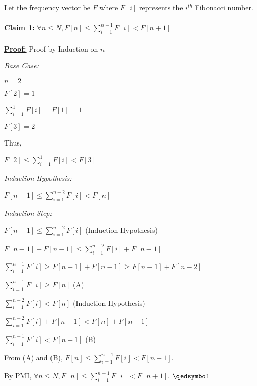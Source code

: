 \documentclass[a4paper]{article}
\begin{document}
\begin{enumerate}[(a)]
\begin{enumerate}[(1)]
    \end{enumerate}
    Let the frequency vector be $F$ where $F[i]$ represents the $i^{th}$ Fibonacci number.\hfill \\ \\
    \underline{\textbf{Claim 1:}} $ \forall n \leq N, F[n] \leq \sum_{i=1}^{n-1} F[i] < F[n+1]$ \\ \\
    \underline{\textbf{Proof:}} Proof by Induction on $n$ \\
    {\textit{Base Case:} \par}
    {\hspace{10mm}    $n = 2$ \par} 
    {\hspace{10mm}    $F[2] = 1$ \par} 
    {\hspace{10mm}    $\sum_{i=1}^{1} F[i] = F[1] = 1$ \par}
    {\hspace{10mm}    $F[3] = 2$ \par}
    {\hspace{10mm} Thus, \par}
    {\hspace{10mm}    $F[2] \leq \sum_{i=1}^{1} F[i] < F[3]$ \par}
    {\textit{Induction Hypothesis:} 
    \par}
    {\hspace{10mm} $F[n-1] \leq \sum_{i=1}^{n-2} F[i] < F[n]$ \par}
    {\textit{Induction Step:} \par}
    {\hspace{10mm} $F[n-1] \leq \sum_{i=1}^{n-2} F[i]$   \hfill (Induction Hypothesis)\par} 
    {\hspace{10mm}    $F[n-1] + F[n-1] \leq \sum_{i=1}^{n-2} F[i] + F[n-1]$ \par}
    {\hspace{10mm}    $\sum_{i=1}^{n-1} F[i] \geq F[n-1] + F[n-1] \geq F[n-1] + F[n-2]$ \par}
    {\hspace{10mm}    $\sum_{i=1}^{n-1} F[i] \geq F[n]$  \hfill (A) \par}
    {\par}
    {\hspace{10mm} $\sum_{i=1}^{n-2} F[i] < F[n]$   \hfill (Induction Hypothesis)\par} 
    {\hspace{10mm}    $\sum_{i=1}^{n-2} F[i] + F[n-1] < F[n] + F[n-1]$ \par}
    {\hspace{10mm}    $\sum_{i=1}^{n-1} F[i] < F[n+1]$ \hfill (B)\par}
    {\hspace{10mm} From (A) and (B), $F[n] \leq \sum_{i=1}^{n-1} F[i] < F[n+1]$.\par}
    By PMI, $ \forall n \leq N, F[n] \leq \sum_{i=1}^{n-1} F[i] < F[n+1]$.
    {\hfill$\qedsymbol$}\\
    

\end{enumerate}
\end{document}
